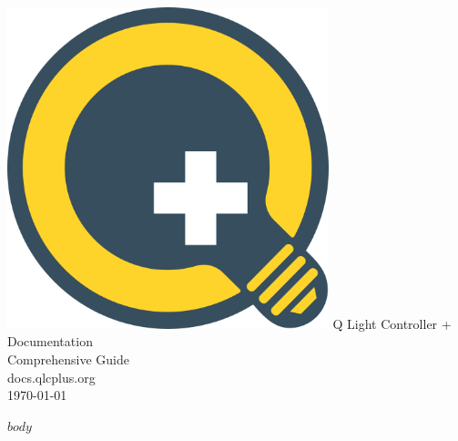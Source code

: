 \documentclass{article}
\begin{document}
\begin{titlepage}
    \pagestyle{empty}
    \protect\thispagestyle{empty}

    \begin{center}
        \includegraphics[width=0.7\textwidth]{./pages/01.basics/qlcplus.svg}  %
        \vfill
        {\Huge Q Light Controller + Documentation} \\
        {\LARGE Comprehensive Guide} \\
        \vfill
        {\Large docs.qlcplus.org} \\
        \vfill
        {\Large \today}  %
    \end{center}
\end{titlepage}

$body$
\end{document}
